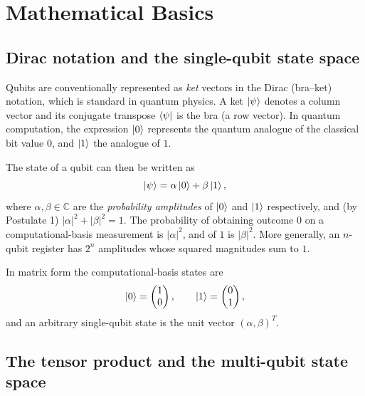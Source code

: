 \setcounter{equation}{0}
\section{Mathematical Basics}

\subsection{Dirac notation and the single-qubit state space}

Qubits are conventionally represented as \emph{ket} vectors in the Dirac (bra--ket) notation, which is standard in quantum physics. A ket $\mathinner{|{\psi}\rangle}$ denotes a column vector and its conjugate transpose $\mathinner{\langle{\psi}|}$ is the bra (a row vector). In quantum computation, the expression $\mathinner{|{0}\rangle}$ represents the quantum analogue of the classical bit value $0$, and $\mathinner{|{1}\rangle}$ the analogue of $1$.

The state of a qubit can then be written as
\begin{equation}
\mathinner{|{\psi}\rangle} = \alpha\mathinner{|{0}\rangle} + \beta\mathinner{|{1}\rangle},
\end{equation}
where $\alpha,\beta\in\mathbb{C}$ are the \emph{probability amplitudes} of $\mathinner{|{0}\rangle}$ and $\mathinner{|{1}\rangle}$ respectively, and (by Postulate 1) $|\alpha|^2 + |\beta|^2 = 1$. The probability of obtaining outcome $0$ on a computational-basis measurement is $|\alpha|^2$, and of $1$ is $|\beta|^2$. More generally, an $n$-qubit register has $2^n$ amplitudes whose squared magnitudes sum to $1$.

In matrix form the computational-basis states are
\begin{equation}
\mathinner{|{0}\rangle} = \begin{pmatrix} 1 \\ 0 \end{pmatrix}, \qquad
\mathinner{|{1}\rangle} = \begin{pmatrix} 0 \\ 1 \end{pmatrix},
\end{equation}
and an arbitrary single-qubit state is the unit vector $(\alpha,\beta)^T$.

\subsection{The tensor product and the multi-qubit state space}

